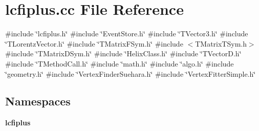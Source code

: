 \section{lcfiplus.\+cc File Reference}
\label{lcfiplus_8cc}
{\ttfamily \#include \char`\"{}lcfiplus.\+h\char`\"{}}\newline
{\ttfamily \#include \char`\"{}Event\+Store.\+h\char`\"{}}\newline
{\ttfamily \#include \char`\"{}T\+Vector3.\+h\char`\"{}}\newline
{\ttfamily \#include \char`\"{}T\+Lorentz\+Vector.\+h\char`\"{}}\newline
{\ttfamily \#include \char`\"{}T\+Matrix\+F\+Sym.\+h\char`\"{}}\newline
{\ttfamily \#include $<$T\+Matrix\+T\+Sym.\+h$>$}\newline
{\ttfamily \#include \char`\"{}T\+Matrix\+D\+Sym.\+h\char`\"{}}\newline
{\ttfamily \#include \char`\"{}Helix\+Class.\+h\char`\"{}}\newline
{\ttfamily \#include \char`\"{}T\+Vector\+D.\+h\char`\"{}}\newline
{\ttfamily \#include \char`\"{}T\+Method\+Call.\+h\char`\"{}}\newline
{\ttfamily \#include \char`\"{}math.\+h\char`\"{}}\newline
{\ttfamily \#include \char`\"{}algo.\+h\char`\"{}}\newline
{\ttfamily \#include \char`\"{}geometry.\+h\char`\"{}}\newline
{\ttfamily \#include \char`\"{}Vertex\+Finder\+Suehara.\+h\char`\"{}}\newline
{\ttfamily \#include \char`\"{}Vertex\+Fitter\+Simple.\+h\char`\"{}}\newline
\subsection*{Namespaces}
\begin{DoxyCompactItemize}
\item 
 \textbf{ lcfiplus}
\end{DoxyCompactItemize}

